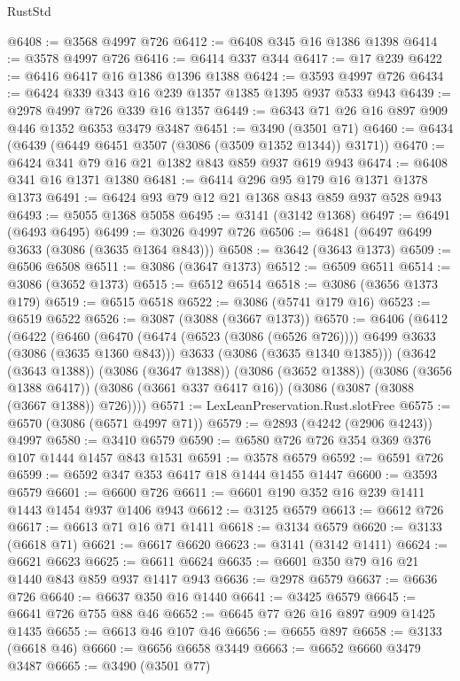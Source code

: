 \begin{lexlean}{RustStd}
\begin{coremodule}
@6408 := @3568 @4997 @726
@6412 := @6408 @345 @16 @1386 @1398
@6414 := @3578 @4997 @726
@6416 := @6414 @337 @344
@6417 := @17 @239
@6422 := @6416 @6417 @16 @1386 @1396 @1388
@6424 := @3593 @4997 @726
@6434 := @6424 @339 @343 @16 @239 @1357 @1385 @1395 @937 @533 @943
@6439 := @2978 @4997 @726 @339 @16 @1357
@6449 := @6343 @71 @26 @16 @897 @909 @446 @1352 @6353 @3479 @3487
@6451 := @3490 (@3501 @71)
@6460 := @6434 (@6439 (@6449 @6451 @3507 (@3086 (@3509 @1352 @1344)) @3171))
@6470 := @6424 @341 @79 @16 @21 @1382 @843 @859 @937 @619 @943
@6474 := @6408 @341 @16 @1371 @1380
@6481 := @6414 @296 @95 @179 @16 @1371 @1378 @1373
@6491 := @6424 @93 @79 @12 @21 @1368 @843 @859 @937 @528 @943
@6493 := @5055 @1368 @5058
@6495 := @3141 (@3142 @1368)
@6497 := @6491 (@6493 @6495)
@6499 := @3026 @4997 @726
@6506 := @6481 (@6497 @6499 @3633 (@3086 (@3635 @1364 @843)))
@6508 := @3642 (@3643 @1373)
@6509 := @6506 @6508
@6511 := @3086 (@3647 @1373)
@6512 := @6509 @6511
@6514 := @3086 (@3652 @1373)
@6515 := @6512 @6514
@6518 := @3086 (@3656 @1373 @179)
@6519 := @6515 @6518
@6522 := @3086 (@5741 @179 @16)
@6523 := @6519 @6522
@6526 := @3087 (@3088 (@3667 @1373))
@6570 := @6406
    (@6412
      (@6422
        (@6460
          (@6470 (@6474 (@6523 (@3086 (@6526 @726)))) @6499 @3633 (@3086 (@3635 @1360 @843)))
          @3633
          (@3086 (@3635 @1340 @1385)))
        (@3642 (@3643 @1388))
        (@3086 (@3647 @1388))
        (@3086 (@3652 @1388))
        (@3086 (@3656 @1388 @6417))
        (@3086 (@3661 @337 @6417 @16))
        (@3086 (@3087 (@3088 (@3667 @1388)) @726))))
@6571 := LexLeanPreservation.Rust.slotFree
@6575 := @6570 (@3086 (@6571 @4997 @71))
@6579 := @2893 (@4242 (@2906 @4243)) @4997
@6580 := @3410 @6579
@6590 := @6580 @726 @726 @354 @369 @376 @107 @1444 @1457 @843 @1531
@6591 := @3578 @6579
@6592 := @6591 @726
@6599 := @6592 @347 @353 @6417 @18 @1444 @1455 @1447
@6600 := @3593 @6579
@6601 := @6600 @726
@6611 := @6601 @190 @352 @16 @239 @1411 @1443 @1454 @937 @1406 @943
@6612 := @3125 @6579
@6613 := @6612 @726
@6617 := @6613 @71 @16 @71 @1411
@6618 := @3134 @6579
@6620 := @3133 (@6618 @71)
@6621 := @6617 @6620
@6623 := @3141 (@3142 @1411)
@6624 := @6621 @6623
@6625 := @6611 @6624
@6635 := @6601 @350 @79 @16 @21 @1440 @843 @859 @937 @1417 @943
@6636 := @2978 @6579
@6637 := @6636 @726
@6640 := @6637 @350 @16 @1440
@6641 := @3425 @6579
@6645 := @6641 @726 @755 @88 @46
@6652 := @6645 @77 @26 @16 @897 @909 @1425 @1435
@6655 := @6613 @46 @107 @46
@6656 := @6655 @897
@6658 := @3133 (@6618 @46)
@6660 := @6656 @6658 @3449
@6663 := @6652 @6660 @3479 @3487
@6665 := @3490 (@3501 @77)

\end{coremodule}
\end{lexlean}
